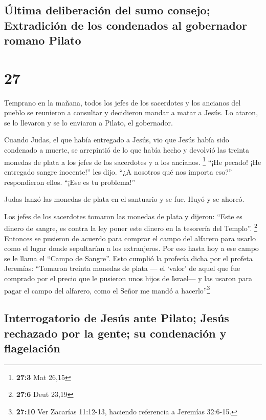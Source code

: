 \hypertarget{uxfaltima-deliberaciuxf3n-del-sumo-consejo-extradiciuxf3n-de-los-condenados-al-gobernador-romano-pilato}{%
\subsection{Última deliberación del sumo consejo; Extradición de los
condenados al gobernador romano
Pilato}\label{uxfaltima-deliberaciuxf3n-del-sumo-consejo-extradiciuxf3n-de-los-condenados-al-gobernador-romano-pilato}}

\hypertarget{section-26}{%
\section{27}\label{section-26}}

 Temprano en la mañana, todos los jefes de los sacerdotes
y los ancianos del pueblo se reunieron a consultar y decidieron mandar a
matar a Jesús.  Lo ataron, se lo llevaron y se lo enviaron
a Pilato, el gobernador.

 Cuando Judas, el que había entregado a Jesús, vio que
Jesús había sido condenado a muerte, se arrepintió de lo que había hecho
y devolvió las treinta monedas de plata a los jefes de los sacerdotes y
a los ancianos. \footnote{\textbf{27:3} Mat 26,15}  ``¡He
pecado! ¡He entregado sangre inocente!'' les dijo. ``¿A nosotros qué nos
importa eso?'' respondieron ellos. ``¡Ese es tu problema!''

 Judas lanzó las monedas de plata en el santuario y se
fue. Huyó y se ahorcó.

 Los jefes de los sacerdotes tomaron las monedas de plata
y dijeron: ``Este es dinero de sangre, es contra la ley poner este
dinero en la tesorería del Templo''. \footnote{\textbf{27:6} Deut 23,19}
 Entonces se pusieron de acuerdo para comprar el campo del
alfarero para usarlo como el lugar donde sepultarían a los extranjeros.
 Por eso hasta hoy a ese campo se le llama el ``Campo de
Sangre''.  Esto cumplió la profecía dicha por el profeta
Jeremías: ``Tomaron treinta monedas de plata --- el `valor' de aquel que
fue comprado por el precio que le pusieron unos hijos de Israel---
 y las usaron para pagar el campo del alfarero, como el
Señor me mandó a hacerlo''\footnote{\textbf{27:10} Ver Zacarías
  11:12-13, haciendo referencia a Jeremías 32:6-15.}

\hypertarget{interrogatorio-de-jesuxfas-ante-pilato-jesuxfas-rechazado-por-la-gente-su-condenaciuxf3n-y-flagelaciuxf3n}{%
\subsection{Interrogatorio de Jesús ante Pilato; Jesús rechazado por la
gente; su condenación y
flagelación}\label{interrogatorio-de-jesuxfas-ante-pilato-jesuxfas-rechazado-por-la-gente-su-condenaciuxf3n-y-flagelaciuxf3n}}

